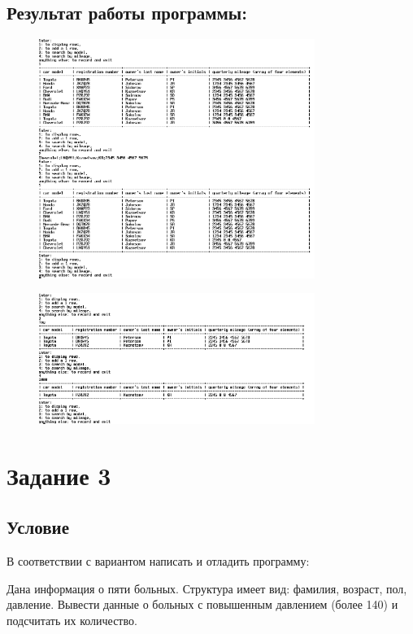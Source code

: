 \documentclass[14pt,a4paper]{article}
\begin{document}
\subsection{Результат работы программы:}
\begin{figure}[h]
    \centering
    \includegraphics[width=0.8\textwidth]{data/demo15_2.png} %
\end{figure}
\begin{figure}[h]
    \centering
    \includegraphics[width=0.8\textwidth]{data/demo15_2_2.png} %
\end{figure}
\newpage

\section*{Задание 3}
\setcounter{subsection}{0}
\subsection{Условие}
В соответствии с вариантом написать и отладить программу:

Дана информация о пяти больных. Структура имеет вид: фамилия, возраст, пол, давление. Вывести данные о больных с повышенным давлением (более 140) и подсчитать их количество.
\end{document}
